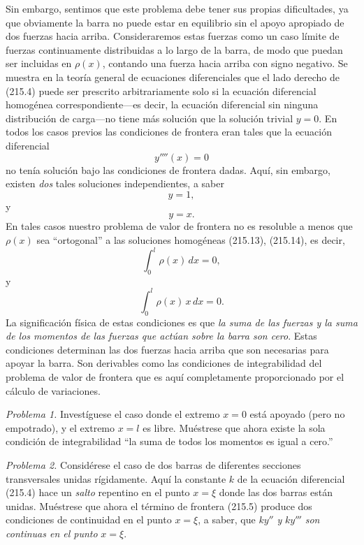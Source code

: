 \documentclass[12pt,a4paper]{book}
\begin{document}
Sin embargo, sentimos que este problema debe tener sus propias dificultades, ya que obviamente la barra no puede estar en equilibrio sin el apoyo apropiado de dos fuerzas hacia arriba. Consideraremos estas fuerzas como un caso límite de fuerzas continuamente distribuidas a lo largo de la barra, de modo que puedan ser incluidas en $\rho(x)$, contando una fuerza hacia arriba con signo negativo. Se muestra en la teoría general de ecuaciones diferenciales que el lado derecho de (215.4) puede ser prescrito arbitrariamente solo si la ecuación diferencial homogénea correspondiente---es decir, la ecuación diferencial sin ninguna distribución de carga---no tiene más solución que la solución trivial $y = 0$. En todos los casos previos las condiciones de frontera eran tales que la ecuación diferencial
\begin{equation}
y''''(x) = 0 \tag{215.12}
\end{equation}
no tenía solución bajo las condiciones de frontera dadas. Aquí, sin embargo, existen \textit{dos} tales soluciones independientes, a saber
\begin{equation}
y = 1, \tag{215.13}
\end{equation}
y
\begin{equation}
y = x. \tag{215.14}
\end{equation}
En tales casos nuestro problema de valor de frontera no es resoluble a menos que $\rho(x)$ sea ``ortogonal'' a las soluciones homogéneas (215.13), (215.14), es decir,
\begin{equation}
\int_0^l \rho(x) \, dx = 0, \tag{215.15}
\end{equation}
y
\begin{equation}
\int_0^l \rho(x) \, x \, dx = 0. \tag{215.16}
\end{equation}
La significación física de estas condiciones es que \textit{la suma de las fuerzas y la suma de los momentos de las fuerzas que actúan sobre la barra son cero}. Estas condiciones determinan las dos fuerzas hacia arriba que son necesarias para apoyar la barra. Son derivables como las condiciones de integrabilidad del problema de valor de frontera que es aquí completamente proporcionado por el cálculo de variaciones.

\textit{Problema 1.} Investíguese el caso donde el extremo $x = 0$ está apoyado (pero no empotrado), y el extremo $x = l$ es libre. Muéstrese que ahora existe la sola condición de integrabilidad ``la suma de todos los momentos es igual a cero.''

\textit{Problema 2.} Considérese el caso de dos barras de diferentes secciones transversales unidas rígidamente. Aquí la constante $k$ de la ecuación diferencial (215.4) hace un \textit{salto} repentino en el punto $x = \xi$ donde las dos barras están unidas. Muéstrese que ahora el término de frontera (215.5) produce dos condiciones de continuidad en el punto $x = \xi$, a saber, que $ky''$ \textit{y} $ky'''$ \textit{son continuas en el punto} $x = \xi$.
\end{document}
